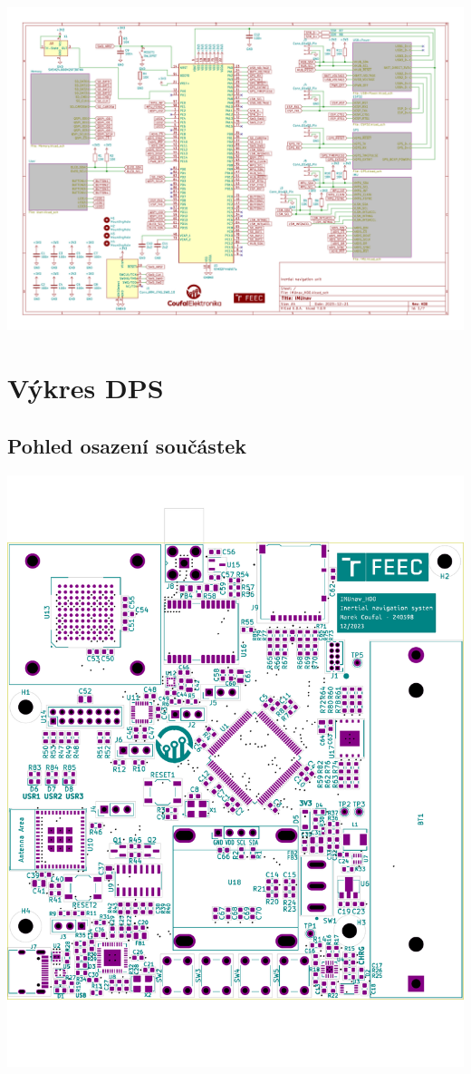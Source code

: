 \includegraphics[angle=90, page=7, width=\textwidth]{KiCad/schematic.pdf}

\chapter{Výkres DPS}
\section{Pohled osazení součástek} \label{placementApp}
\includegraphics[width=\textwidth]{KiCad/boardTopParts}

